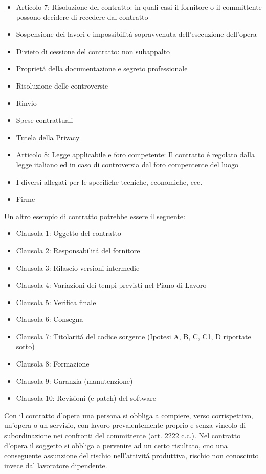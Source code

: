 \documentclass{article}
\begin{document}
\begin{itemize}
    \item Articolo 7: Risoluzione del contratto: in quali casi il fornitore o il committente possono decidere di recedere dal contratto
    \item Sospensione dei lavori e impossibilit\'a sopravvenuta dell'esecuzione dell'opera
    \item Divieto di cessione del contratto: non subappalto
    \item Propriet\'a della documentazione e segreto professionale
    \item Risoluzione delle controversie
    \item Rinvio
    \item Spese contrattuali
    \item Tutela della Privacy
    \item Articolo 8: Legge applicabile e foro competente: Il contratto \'e regolato dalla legge italiano ed in caso di controversia dal foro compentente del luogo
    \item I diversi allegati per le specifiche tecniche, economiche, ecc.
    \item Firme
\end{itemize}

Un altro esempio di contratto potrebbe essere il seguente:
\begin{itemize}
    \item Clausola 1: Oggetto del contratto
    \item Clausola 2: Responsabilit\'a del fornitore
    \item Clausola 3: Rilascio versioni intermedie
    \item Clausola 4: Variazioni dei tempi previsti nel Piano di Lavoro
    \item Clausola 5: Verifica finale
    \item Clausola 6: Consegna
    \item Clausola 7: Titolarit\'a del codice sorgente (Ipotesi A, B, C, C1, D riportate sotto)
    \item Clausola 8: Formazione
    \item Clausola 9: Garanzia (manutenzione)
    \item Clausola 10: Revisioni (e patch) del software
\end{itemize}

Con il contratto d'opera una persona si obbliga a compiere, verso corrispettivo, un'opera o un servizio, con lavoro prevalentemente proprio e senza vincolo di subordinazione nei confronti del committente (art. 2222 c.c.). Nel contratto d'opera il soggetto si obbliga a pervenire ad un certo risultato, cno una conseguente assunzione del rischio nell'attivit\'a produttiva, rischio non conosciuto invece dal lavoratore dipendente.
\end{document}
